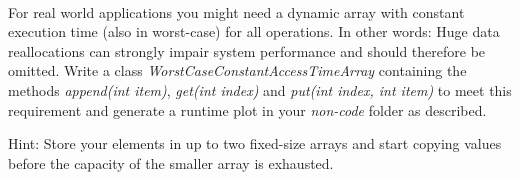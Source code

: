  \\
For real world applications you might need a dynamic array with constant
execution time (also in worst-case) for all operations.
In other words:
Huge data reallocations can strongly impair system performance and should
therefore be omitted.
Write a class \textit{WorstCaseConstantAccessTimeArray} containing the methods
\textit{append(int item)}, \textit{get(int index)} and
\textit{put(int index, int item)} to meet this requirement and generate a
runtime plot in your \textit{non-code} folder as described.

Hint:  Store your elements in up to two fixed-size arrays and start copying
values before the capacity of the smaller array is exhausted.